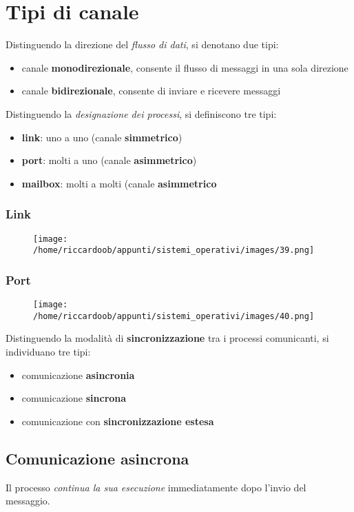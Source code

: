 \section{Tipi di canale}
Distinguendo la direzione del \textit{flusso di dati}, si denotano due tipi:
\begin{itemize}
    \item canale \textbf{monodirezionale}, consente il flusso di messaggi in una sola direzione
    \item canale \textbf{bidirezionale}, consente di inviare e ricevere messaggi
\end{itemize}
Distinguendo la \textit{designazione dei processi}, si definiscono tre tipi:
\begin{itemize}
    \item \textbf{link}: uno a uno (canale \textbf{simmetrico})
    \item \textbf{port}: molti a uno (canale \textbf{asimmetrico})
    \item \textbf{mailbox}: molti a molti (canale \textbf{asimmetrico}
\end{itemize}

\subsubsection{Link}
\begin{figure}[H]
    \centering
    \texttt{[image: /home/riccardoob/appunti/sistemi\_operativi/images/39.png]}
\end{figure}
\subsubsection{Port}
\begin{figure}[H]
    \centering
    \texttt{[image: /home/riccardoob/appunti/sistemi\_operativi/images/40.png]}
\end{figure}

Distinguendo la modalità di \textbf{sincronizzazione} tra i processi comunicanti, si individuano tre tipi:
\begin{itemize}
    \item comunicazione \textbf{asincronia}
    \item comunicazione \textbf{sincrona}
    \item comunicazione con \textbf{sincronizzazione estesa}
\end{itemize}

\subsection{Comunicazione asincrona}
Il processo \textit{continua la sua esecuzione} immediatamente dopo l'invio del messaggio.

